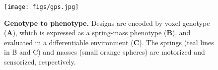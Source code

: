 \begin{figure}[t]
    \centering
    \texttt{[image: figs/gps.jpg]}
    \vspace{-18pt}
    \caption{\textbf{Genotype to phenotype.}
    Designs are 
    encoded by voxel genotype (\textbf{A}), 
    which is expressed as a
    spring-mass phenotype (\textbf{B}),
    and evaluated in a
    differentiable environment (\textbf{C}).
    The springs (teal lines in B and C) and masses (small orange spheres) are motorized and sensorized, respectively.
    }
    \vspace{-12pt}
    \label{fig:methods-geno-pheno-sim}
\end{figure}